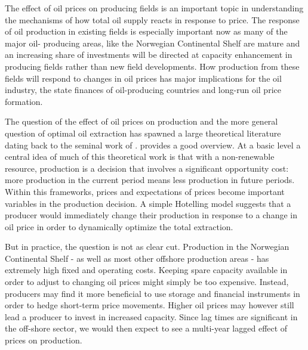 \documentclass[11pt]{article}
\begin{document}

The effect of oil prices on producing fields is an important topic in understanding the mechanisms of how total oil supply reacts in response to price. The response of oil production in existing fields is especially important now as many of the major oil- producing areas, like the Norwegian Continental Shelf are mature and an increasing share of investments will be directed at capacity enhancement in producing fields rather than new field developments. How production from these fields will respond to changes in oil prices has major implications for the oil industry, the state finances of oil-producing countries and long-run oil price formation.

The question of the effect of oil prices on production and the more general question of optimal oil extraction has spawned a large theoretical literature dating back to the seminal work of \citet{hotelling_economics_1931}. \citet{krautkraemer_nonrenewable_1998} provides a good overview. At a basic level a central idea of much of this theoretical work is that with a non-renewable resource, production is a decision that involves a significant opportunity cost: more production in the current period means less production in future periods.  Within this frameworks, prices and expectations of prices become important variables in the production decision. A simple Hotelling model suggests that a producer would immediately change their production in response to a change in oil price in order to dynamically optimize the total extraction.

But in practice, the question is not as clear cut.  Production in the Norwegian Continental Shelf - as well as most other offshore production areas - has extremely high fixed and operating costs.  Keeping spare capacity available in order to adjust to changing oil prices might simply be too expensive.  Instead, producers may find it more beneficial to use storage and financial instruments in order to hedge short-term price movements. Higher oil prices may however still lead a producer to invest in increased capacity.  Since lag times are significant in the off-shore sector, we would then expect to see a multi-year lagged effect of prices on production.  
\end{document}

